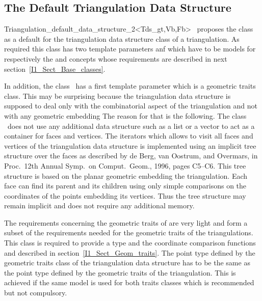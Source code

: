 \subsection{The Default Triangulation Data Structure}
\begin{ccClassTemplate}{Triangulation_default_data_structure_2<Tds_gt,Vb,Fb>}
\cgal\ proposes the class 
as a default for the triangulation data structure class of a triangulation.
As required this class has two template parameters  anf 
which have 
to be models for respectively the
 and  concepts whose requirements are described in next 
section~\ref{I1_Sect_Base_classes}. 

In addition, the class \ccClassTemplateName\ has a first template parameter
which is a geometric traits class. This may be surprising because
the triangulation data structure is supposed to deal only with the combinatorial
aspect of the triangulation and not with any geometric embedding
The reason for that is the following.
The class \ccClassTemplateName\ does not use any additional data structure
such as a list or a vector to act as a container for faces and vertices.
The iterators which allows to visit all faces and vertices of the
triangulation
data structure
is implemented using  an implicit tree structure over the faces
as described by
 de Berg, van Oostrum, and Overmars, 
in Proc.\ 12th Annual Symp.\ on Comput.\ Geom.,
1996, pages C5--C6. This tree structure is  based on the planar
geometric embedding
the triangulation. Each face 
 can find its parent 
and its children using only simple comparisons on the
coordinates of the points embedding its vertices.
Thus the tree structure may remain implicit 
and does not require any additional memory. 

The requirements concerning the geometric traits  of
 are very light and form a subset of the requirements needed
for the geometric traits of the triangulations. 
This class is required  to provide a type 
and the coordinate comparison functions  and
described in section~\ref{I1_Sect_Geom_traits}. The point type
defined by the geometric traits class of the triangulation data structure
has to be the same 
as the point type defined by the geometric traits of the triangulation.
This is achieved if the same model is used for both traits classes
which is recommended but not compulsory.




\end{ccClassTemplate}


